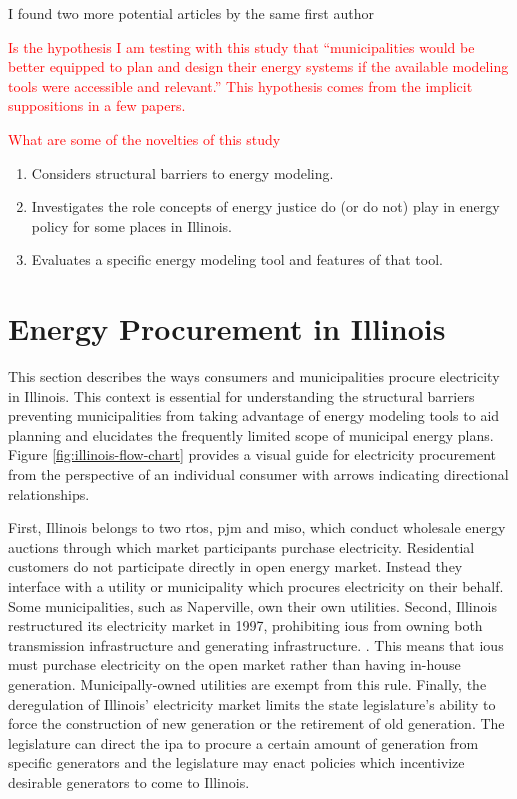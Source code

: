 I found two more potential articles by the same first author
\cite{diezmartinez_us_2022,diezmartinez_municipal_2024}


\textcolor{red}{Is the hypothesis I am testing with this study that
``municipalities would be better equipped to plan and design their energy
systems if the available modeling tools were accessible and relevant.'' This
hypothesis comes from the implicit suppositions in a few papers. }

\textcolor{red}{What are some of the novelties of this study}
\begin{enumerate}
    \item Considers structural barriers to energy modeling.
    \item Investigates the role concepts of energy justice do (or do not) play
    in energy policy for some places in Illinois.
    \item Evaluates a specific energy modeling tool and features of that tool.
\end{enumerate}

\section{Energy Procurement in Illinois}

This section describes the ways consumers and municipalities procure electricity
in Illinois. This context is essential for understanding the structural barriers
preventing municipalities from taking advantage of energy modeling tools to aid
planning and elucidates the frequently limited scope of municipal energy plans.
Figure \ref{fig:illinois-flow-chart} provides a visual guide for electricity
procurement from the perspective of an individual consumer with arrows
indicating directional relationships.

First, Illinois belongs to two \acp{rto}, \ac{pjm} and \ac{miso}, which conduct
wholesale energy auctions through which market participants purchase
electricity. Residential customers do not participate directly in open energy
market. Instead they interface with a utility or municipality which procures
electricity on their behalf. Some municipalities, such as Naperville, own their
own utilities. Second, Illinois restructured its electricity market in 1997,
prohibiting \aclp{iou} from owning both transmission infrastructure and
generating infrastructure. \cite{illinois_90th_general_assembly_electric_1997}.
This means that \acp{iou} must purchase electricity on the open market rather
than having in-house generation. Municipally-owned utilities are exempt from
this rule. Finally, the deregulation of Illinois' electricity market limits the
state legislature's ability to force the construction of new generation or the
retirement of old generation. The legislature can direct the \ac{ipa} to procure
a certain amount of generation from specific generators and the legislature may
enact policies which incentivize desirable generators to come to Illinois.


